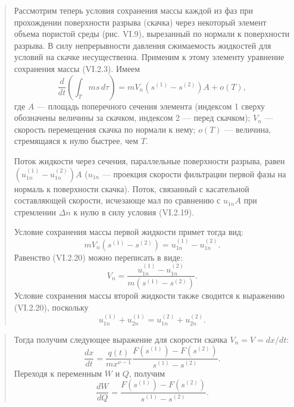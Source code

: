 \documentclass[12pt,a4paper]{article}
\begin{document}
\begin{quote}\sloppy
Рассмотрим теперь условия сохранения массы каждой из фаз при прохождении поверхности разрыва (скачка) через некоторый элемент объема пористой среды (рис. VI.9), вырезанный по нормали к поверхности разрыва. В силу непрерывности давления сжимаемость
жидкостей для условий на скачке несущественна. Применим к этому элементу уравнение сохранения массы (VI.2.3). Имеем
\[\frac{d}{dt}\left(\int_Tms\,d\tau\right)=mV_n(s^{(1)}-s^{(2)})A+o(T),\]
где $A$ --- площадь поперечного сечения элемента (индексом 1 сверху обозначены величины за скачком, индексом 2 --- перед скачком); $V_n$ --- скорость перемещения скачка по нормали к нему; $o(T)$ --- величина, стремящаяся к нулю быстрее, чем $T$.


Поток жидкости через сечения, параллельные поверхности разрыва, равен $(u_{1n}^{(1)}-u_{1n}^{(2)})A$ ($u_{1n}$ --- проекция скорости фильтрации первой фазы на нормаль к поверхности скачка). Поток, связанный с касательной составляющей скорости, исчезающе мал по сравнению с $u_{1n}A$ при стремлении $\Delta n$ к нулю в силу условия (VI.2.19).

Условие сохранения массы первой жидкости примет тогда вид:
\begin{equation}mV_n(s^{(1)}-s^{(2)})=u_{1n}^{(1)}-u_{1n}^{(2)}.\tag{VI.2.20}\label{q11:eq-VI-2-20}\end{equation}
Равенство (VI.2.20) можно переписать в виде:
\begin{equation}V_n=\frac{u_{1n}^{(1)}-u_{1n}^{(2)}}{m(s^{(1)}-s^{(2)})}.\tag{VI.2.21}\label{q11:eq-VI-2-21}\end{equation}
Условие сохранения массы второй жидкости также сводится к выражению (VI.2.20), поскольку
\begin{equation}u_{1n}^{(1)}+u_{2n}^{(1)}=u_{1n}^{(2)}+u_{2n}^{(2)}.\tag{VI.2.22}\label{q11:eq-VI-2-22}\end{equation}
\par\nobreak{}\par
\end{quote}

\begin{quote}\sloppy
Тогда получим следующее выражение для скорости скачка $V_n=V=dx/dt$:
\begin{equation}\frac{dx}{dt}=\frac{q(t)}{mx^{\nu-1}}\frac{F(s^{(1)})-F(s^{(2)})}{s^{(1)}-s^{(2)}}.\tag{VI.2.24}\label{q11:eq-VI-2-24}\end{equation}
Переходя к переменным $W$ и $Q$, получим
\begin{equation}\frac{dW}{dQ}=\frac{F(s^{(1)})-F(s^{(2)})}{s^{(1)}-s^{(2)}}.\tag{VI.2.25}\label{q11:eq-VI-2-25}\end{equation}
\par\nobreak{}\par
\end{quote}
\end{document}
